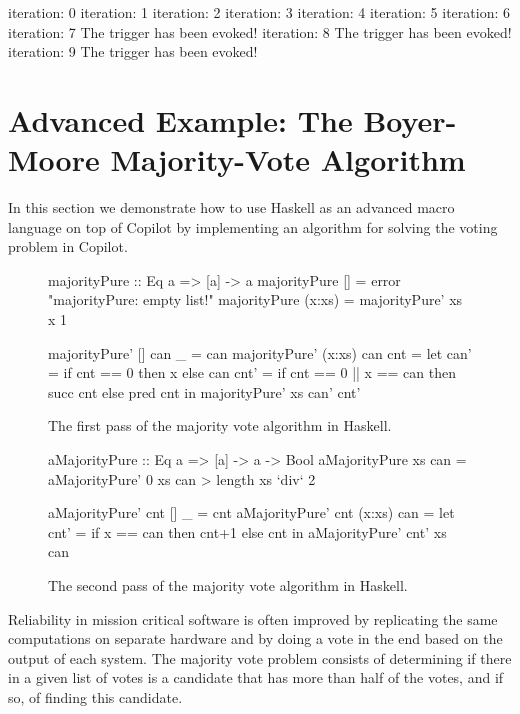 \documentclass[]{article}
\theoremstyle{example}
\begin{document}
\begin{code}
iteration: 0
iteration: 1
iteration: 2
iteration: 3
iteration: 4
iteration: 5
iteration: 6
iteration: 7
The trigger has been evoked!
iteration: 8
The trigger has been evoked!
iteration: 9
The trigger has been evoked!
\end{code}

\section{Advanced Example: The Boyer-Moore Majority-Vote Algorithm}
\label{subsec:boyer_moore}

In this section we demonstrate how to use Haskell as an advanced macro language
on top of Copilot by implementing an algorithm for solving the voting problem
in Copilot.

\begin{figure}
\begin{code}
majorityPure :: Eq a => [a] -> a
majorityPure []     = error "majorityPure: empty list!"
majorityPure (x:xs) = majorityPure' xs x 1

majorityPure' []     can _   = can
majorityPure' (x:xs) can cnt =
  let
    can' = if cnt == 0 then x else can
    cnt' = if cnt == 0 || x == can then succ cnt else pred cnt
  in
    majorityPure' xs can' cnt'
\end{code}
\caption{The first pass of the majority vote algorithm in Haskell.}
\label{fig:majority_pure}
\end{figure}

\begin{figure}
\begin{code}
aMajorityPure :: Eq a => [a] -> a -> Bool
aMajorityPure xs can = aMajorityPure' 0 xs can > length xs `div` 2

aMajorityPure' cnt []     _   = cnt
aMajorityPure' cnt (x:xs) can =
  let
    cnt' = if x == can then cnt+1 else cnt
  in
    aMajorityPure' cnt' xs can
\end{code}
\caption{The second pass of the majority vote algorithm in Haskell.}
\label{fig:amajority_pure}
\end{figure}

Reliability in mission critical software is often improved by replicating
the same computations on separate hardware and by doing a vote in the end
based on the output of each system. The majority vote problem consists of
determining if there in a given list of votes is a candidate that has more
than half of the votes, and if so, of finding this candidate.
\end{document}
